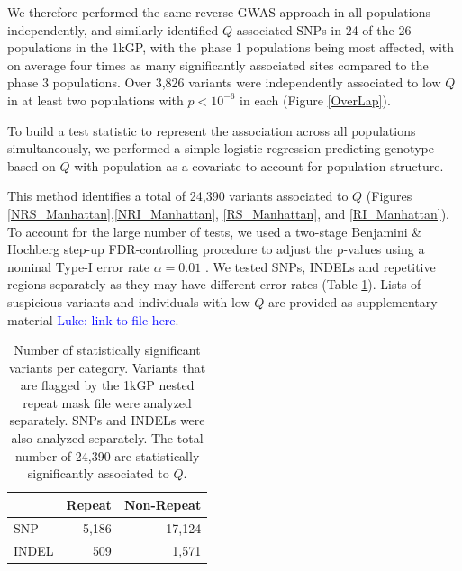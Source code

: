 \documentclass[9pt,lineno]{elife}
\newcommand{\luke}[1]{\textcolor{blue}{Luke: #1}}
\begin{document}
We therefore performed the same reverse GWAS approach in all populations independently, and similarly identified $Q$-associated SNPs in 24 of the 26 populations in the 1kGP, with the phase 1 populations being most affected, with on average four times as many significantly associated sites compared to the phase 3 populations.
Over 3,826 variants were independently associated to low $Q$ in at least two populations with $ p < 10^{-6}$ in each (Figure \ref{OverLap}).

To build a test statistic to represent the association across all populations simultaneously, we performed a simple logistic regression predicting genotype based on $Q$ with population as a covariate to account for population structure.

This method identifies a total of 24,390 variants associated to $Q$ (Figures \ref{NRS_Manhattan},\ref{NRI_Manhattan}, \ref{RS_Manhattan}, and \ref{RI_Manhattan}). 
To account for the large number of tests, we used a two-stage Benjamini \& Hochberg step-up FDR-controlling procedure to adjust the p-values using a nominal Type-I error rate $\alpha = 0.01$ \citep{Benjamini2006}. We tested SNPs, INDELs and repetitive regions separately as they may have different error rates (Table \ref{sigTable}).
Lists of suspicious variants and individuals with low $Q$ are provided as supplementary material \luke{link to file here}.


\begin{table}[h]
\centering
\begin{tabular}{l  r r}
                      & {Repeat}  & {Non-Repeat}       \\ \hline
{SNP}  & 5,186 & 17,124 \\  
{INDEL} & 509 & 1,571 \\ \hline
\end{tabular}
\caption{Number of statistically significant variants per category. Variants that are flagged by the 1kGP nested repeat mask file were analyzed separately. SNPs and INDELs were also analyzed separately. The total number of 24,390 are statistically significantly associated to $Q$.}
\label{sigTable}
\end{table}
\end{document}
